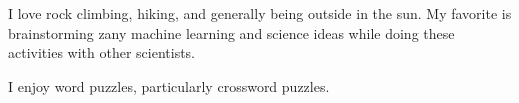 \documentclass[11pt, letterpaper]{awesome-cv}
\begin{document}
\vspace{\acvSectionContentTopSkip}


\vspace{\acvSectionContentTopSkip}
\begin{cvitems}
\item I love rock climbing, hiking, and generally being outside in the sun. My favorite is brainstorming zany machine learning and science ideas while doing these activities with other scientists. 
\item I enjoy word puzzles, particularly crossword puzzles. 
\end{cvitems}
 
\end{document}
